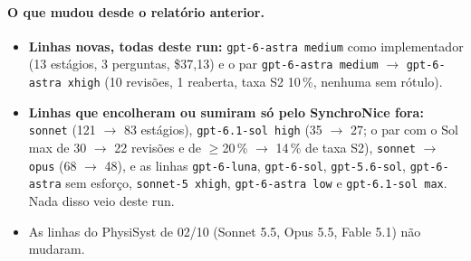 \documentclass[11pt,a4paper]{article}
\begin{document}
\medskip
{}

\paragraph{O que mudou desde o relatório anterior.}
\begin{itemize}
  \item \textbf{Linhas novas, todas deste run:} \texttt{gpt-6-astra medium}
        como implementador (13 estágios, 3 perguntas, \$37,13) e o par
        \texttt{gpt-6-astra medium} $\to$ \texttt{gpt-6-astra xhigh} (10
        revisões, 1 reaberta, taxa S2 10\,\%, nenhuma sem rótulo).
  \item \textbf{Linhas que encolheram ou sumiram só pelo SynchroNice fora:}
        \texttt{sonnet} (121 $\to$ 83 estágios), \texttt{gpt-6.1-sol high}
        (35 $\to$ 27; o par com o Sol max de 30 $\to$ 22 revisões e de
        $\geq$20\,\% $\to$ 14\,\% de taxa S2), \texttt{sonnet} $\to$
        \texttt{opus} (68 $\to$ 48), e as linhas \texttt{gpt-6-luna},
        \texttt{gpt-6-sol}, \texttt{gpt-5.6-sol}, \texttt{gpt-6-astra} sem
        esforço, \texttt{sonnet-5 xhigh}, \texttt{gpt-6-astra low} e
        \texttt{gpt-6.1-sol max}. Nada disso veio deste run.
  \item As linhas do PhysiSyst de 02/10 (Sonnet 5.5, Opus 5.5, Fable 5.1) não
        mudaram.
\end{itemize}
\end{document}
